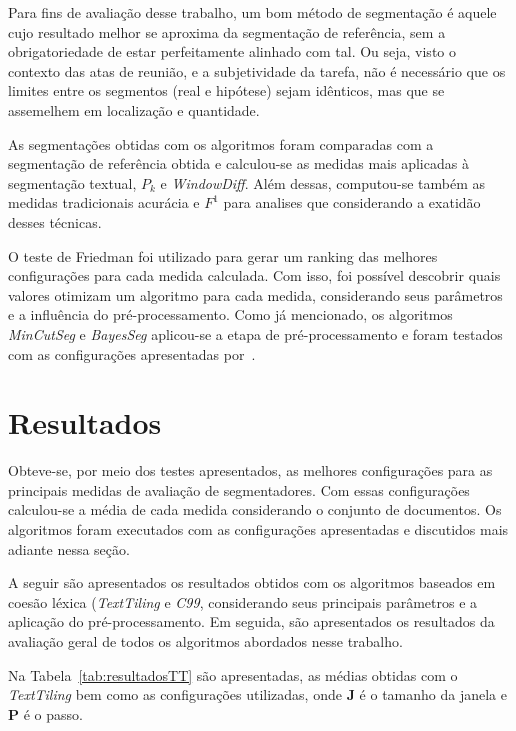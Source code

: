 Para fins de avaliação desse trabalho, um bom método de segmentação é aquele cujo resultado melhor se aproxima da segmentação de referência, sem a obrigatoriedade de estar perfeitamente alinhado com tal. Ou seja, visto o contexto das atas de reunião, e a subjetividade da tarefa, não é necessário que os limites entre os segmentos (real e hipótese) sejam idênticos, mas que se assemelhem em localização e quantidade.

As segmentações obtidas com os algoritmos foram comparadas com a segmentação de referência obtida e calculou-se as medidas mais aplicadas à segmentação textual, $P_k$ e \textit{WindowDiff}. Além dessas, computou-se também as medidas tradicionais acurácia e $F^1$ para analises que considerando a exatidão desses técnicas.

O teste de Friedman foi utilizado para gerar um ranking das melhores configurações para cada medida calculada. Com isso, foi possível descobrir quais valores otimizam um algoritmo para cada medida, considerando seus parâmetros e a influência do pré-processamento. Como já mencionado, os algoritmos \textit{MinCutSeg} e \textit{BayesSeg} aplicou-se a etapa de pré-processamento e foram testados com as configurações apresentadas por~\cite{Eis2008}. 



\section{Resultados}

Obteve-se, por meio dos testes apresentados, as melhores configurações para as principais medidas de avaliação de segmentadores. Com essas configurações calculou-se a média de cada medida considerando o conjunto de documentos. Os algoritmos foram executados com as configurações apresentadas e discutidos mais adiante nessa seção.

A seguir são apresentados os resultados obtidos com os algoritmos baseados em coesão léxica (\textit{TextTiling} e \textit{C99}, considerando seus principais parâmetros e a aplicação do pré-processamento. Em seguida, são apresentados os resultados da avaliação geral de todos os algoritmos abordados nesse trabalho.

Na Tabela~\ref{tab:resultadosTT} são apresentadas, as médias obtidas com o \textit{TextTiling} bem como as configurações utilizadas, onde \textbf{J} é o tamanho da janela e \textbf{P} é o passo.



